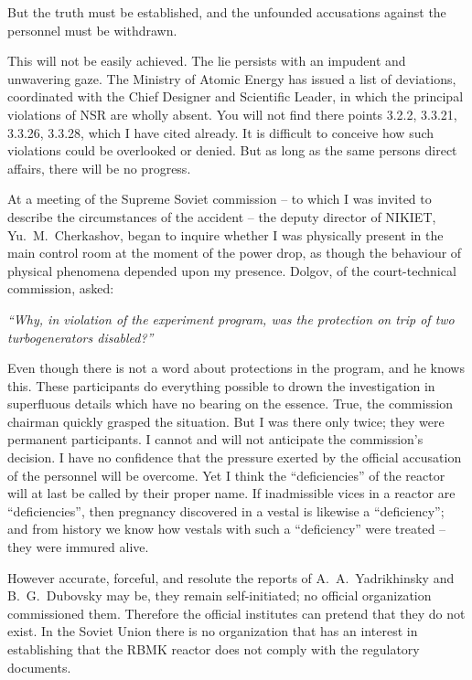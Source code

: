 \documentclass[openright]{bookest}
\begin{document}
But the truth must be established, and the unfounded accusations against the personnel must be withdrawn.

This will not be easily achieved. The lie persists with an impudent and unwavering gaze. The Ministry of Atomic Energy has issued a list of deviations, coordinated with the Chief Designer and Scientific Leader, in which the principal violations of NSR are wholly absent. You will not find there points 3.2.2, 3.3.21, 3.3.26, 3.3.28, which I have cited already. It is difficult to conceive how such violations could be overlooked or denied. But as long as the same persons direct affairs, there will be no progress.

At a meeting of the Supreme Soviet commission -- to which I was invited to describe the circumstances of the accident -- the deputy director of NIKIET, Yu.~M.~Cherkashov, began to inquire whether I was physically present in the main control room at the moment of the power drop, as though the behaviour of physical phenomena depended upon my presence. Dolgov, of the court-technical commission, asked:

\begin{personal}
\textit{``Why, in violation of the experiment program, was the protection on trip of two turbogenerators disabled?''}
\end{personal}

Even though there is not a word about protections in the program, and he knows this. These participants do everything possible to drown the investigation in superfluous details which have no bearing on the essence. True, the commission chairman quickly grasped the situation. But I was there only twice; they were permanent participants. I cannot and will not anticipate the commission's decision. I have no confidence that the pressure exerted by the official accusation of the personnel will be overcome. Yet I think the ``deficiencies'' of the reactor will at last be called by their proper name. If inadmissible vices in a reactor are ``deficiencies'', then pregnancy discovered in a vestal is likewise a ``deficiency''; and from history we know how vestals with such a ``deficiency'' were treated -- they were immured alive.

However accurate, forceful, and resolute the reports of A.~A.~Yadrikhinsky and B.~G.~Dubovsky may be, they remain self-initiated; no official organization commissioned them. Therefore the official institutes can pretend that they do not exist. In the Soviet Union there is no organization that has an interest in establishing that the RBMK reactor does not comply with the regulatory documents.
\end{document}
